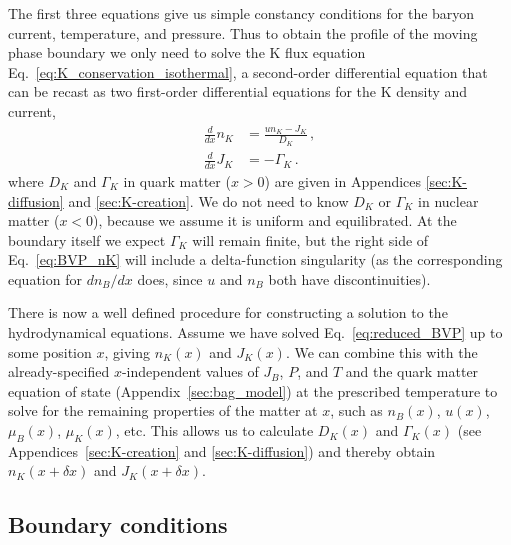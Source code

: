 \documentclass[10pt,superscriptaddress,
amsmath,aps,prc,twocolumn,nofootinbib,floatfix]{revtex4-1}
\newcommand{\Ga}{\Gamma}
\newcommand{\de}{\delta}
\begin{document}
%
The first three equations give us simple constancy conditions for the baryon current, temperature, and pressure.
%
Thus to obtain the profile of the moving phase boundary we only need to solve the K flux equation Eq.~\eqref{eq:K_conservation_isothermal}, a second-order differential equation that can be recast as two first-order differential equations for the K density and current,
\begin{subequations}
\label{eq:reduced_BVP}
\begin{align}
 \frac{d}{dx}n_K &=\frac{un_K-J_K}{D_K}\,,
\label{eq:BVP_nK}\\
 \frac{d}{dx}J_K &=-\Gamma_K\,.
\label{eq:BVP_jK}
\end{align}
\end{subequations}
%
where $D_K$ and $\Ga_K$ in quark matter ($x>0$) are given in Appendices \ref{sec:K-diffusion} and \ref{sec:K-creation}. We do not need to know $D_K$ or $\Ga_K$  in nuclear matter ($x<0$), because we assume it is uniform and equilibrated. At the boundary itself we expect $\Ga_K$ will remain finite, but the right side of Eq.~\eqref{eq:BVP_nK} will include a 
delta-function singularity (as the corresponding equation for $dn_B/dx$ does, since $u$ and $n_B$ both have discontinuities).


There is now a well defined procedure for constructing a solution to the hydrodynamical equations.  
Assume we have solved Eq.~\eqref{eq:reduced_BVP} up to some position $x$, giving $n_K(x)$ and $J_K(x)$.
We can combine this with the already-specified $x$-independent values of
$J_B$, $P$, and $T$
and the quark matter equation of state (Appendix~\ref{sec:bag_model}) at the prescribed temperature to solve for the remaining properties of the matter at $x$, such as $n_B(x)$, $u(x)$, $\mu_B(x)$, $\mu_K(x)$, etc.
This allows us to calculate $D_K(x)$ and $\Gamma_K(x)$ (see Appendices~\ref{sec:K-creation} and \ref{sec:K-diffusion}) and thereby obtain $n_K(x+\de x)$ and $J_K(x+\de x)$.

\subsection{Boundary conditions}
\label{sec:boundary_conditions}
\end{document}
